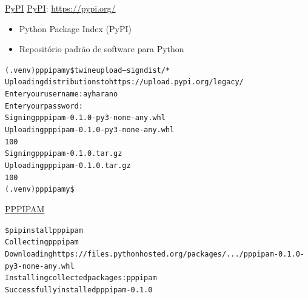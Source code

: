 \documentclass[11pt]{beamer}
\begin{document}
\begin{frame}[fragile]{\href{https://pypi.org/}{PyPI}}
  \href{https://pypi.org/}{PyPI}: \url{https://pypi.org/}

  \begin{itemize}
    \item Python Package Index (PyPI)
    \item Repositório padrão de software para Python
  \end{itemize}
\end{frame}

\begin{frame}[fragile]
\begin{alltt}\footnotesize
(.venv) pppipam y\$ twine upload --sign dist/*
Uploading distributions to https://upload.pypi.org/legacy/
Enter your username: ayharano
Enter your password:
Signing pppipam-0.1.0-py3-none-any.whl
Uploading pppipam-0.1.0-py3-none-any.whl
100%
Signing pppipam-0.1.0.tar.gz
Uploading pppipam-0.1.0.tar.gz
100%
(.venv) pppipam y\$
\end{alltt}
\end{frame}


\begin{frame}[fragile]{\href{https://pypi.org/project/pppipam/}{PPPIPAM}}
  \hspace*{-.5cm}
\end{frame}


\begin{frame}[fragile]
\begin{alltt}\footnotesize
\$ pip install pppipam
Collecting pppipam
  Downloading https://files.pythonhosted.org/packages/.../pppipam-0.1.0-py3-none-any.whl
Installing collected packages: pppipam
Successfully installed pppipam-0.1.0
\end{alltt}
\end{frame}
\end{document}

